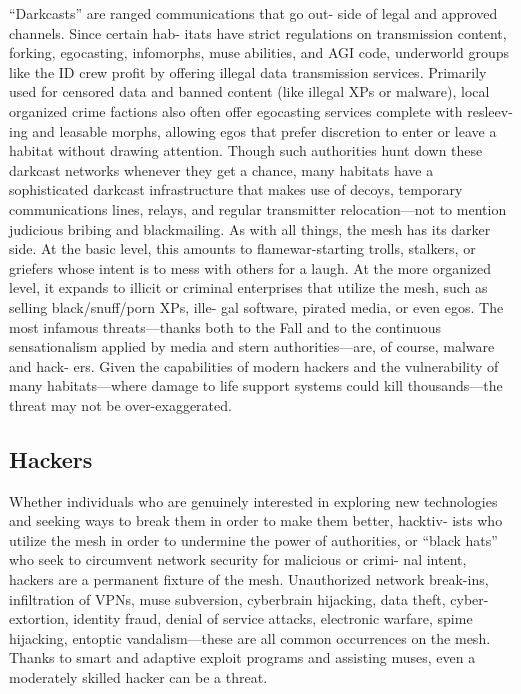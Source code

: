 ``Darkcasts'' are ranged communications that go out-
side of legal and approved channels. Since certain hab-
itats have strict regulations on transmission content, 
forking, egocasting, infomorphs, muse abilities, and 
AGI code, underworld groups like the ID crew profit 
by offering illegal data transmission services. Primarily 
used for censored data and banned content (like illegal 
XPs or malware), local organized crime factions also 
often offer egocasting services complete with resleev-
ing and leasable morphs, allowing egos that prefer 
discretion to enter or leave a habitat without drawing 
attention. Though such authorities hunt down these 
darkcast networks whenever they get a chance, many 
habitats have a sophisticated darkcast infrastructure 
that makes use of decoys, temporary communications 
lines, relays, and regular transmitter relocation—not 
to mention judicious bribing and blackmailing.
As with all things, the mesh has its darker side. At 
the basic level, this amounts to flamewar-starting 
trolls, stalkers, or griefers whose intent is to mess 
with others for a laugh. At the more organized level, 
it expands to illicit or criminal enterprises that utilize 
the mesh, such as selling black/snuff/porn XPs, ille-
gal software, pirated media, or even egos. The most 
infamous threats—thanks both to the Fall and to 
the continuous sensationalism applied by media and 
stern authorities—are, of course, malware and hack-
ers. Given the capabilities of modern hackers and the 
vulnerability of many habitats—where damage to life 
support systems could kill thousands—the threat may 
not be over-exaggerated.

\subsection{Hackers}

Whether individuals who are genuinely interested 
in exploring new technologies and seeking ways to 
break them in order to make them better, hacktiv-
ists who utilize the mesh in order to undermine the 
power of authorities, or ``black hats'' who seek to 
circumvent network security for malicious or crimi-
nal intent, hackers are a permanent fixture of the 
mesh. Unauthorized network break-ins, infiltration 
of VPNs, muse subversion, cyberbrain hijacking, data 
theft, cyber-extortion, identity fraud, denial of service 
attacks, electronic warfare, spime hijacking, entoptic 
vandalism—these are all common occurrences on the 
mesh. Thanks to smart and adaptive exploit programs 
and assisting muses, even a moderately skilled hacker 
can be a threat.

